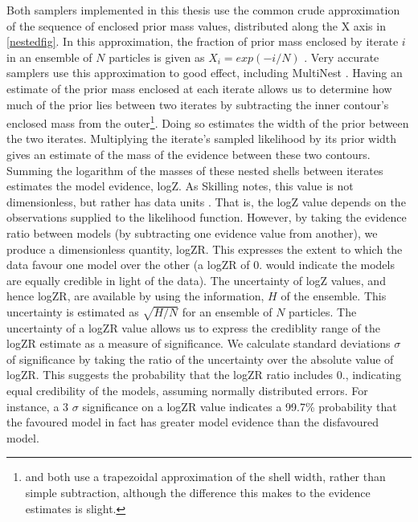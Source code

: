 Both samplers implemented in this thesis use the common crude approximation of the sequence of enclosed prior mass values, distributed along the X axis in \autoref{nestedfig}. In this approximation, the fraction of prior mass enclosed by iterate $i$ in an ensemble of $N$ particles is given as $X_{i}=exp(-i/N)$ \cite{Skilling2006}. Very accurate samplers use this approximation to good effect, including MultiNest \cite{Feroz2009}. Having an estimate of the prior mass enclosed at each iterate allows us to determine how much of the prior lies between two iterates by subtracting the inner contour's enclosed mass from the outer\footnote{ and  both use a trapezoidal approximation of the shell width, rather than simple subtraction, although the difference this makes to the evidence estimates is slight.}. Doing so estimates the width of the prior between the two iterates. Multiplying the iterate's sampled likelihood by its prior width gives an estimate of the mass of the evidence between these two contours. Summing the logarithm of the masses of these nested shells between iterates estimates the model evidence, logZ. As Skilling notes, this value is not dimensionless, but rather has data units \cite{Skilling2012}. That is, the logZ value depends on the observations supplied to the likelihood function. However, by taking the evidence ratio between models (by subtracting one evidence value from another), we produce a dimensionless quantity, logZR. This expresses the extent to which the data favour one model over the other (a logZR of 0. would indicate the models are equally credible in light of the data). The uncertainty of logZ values, and hence logZR, are available by using the information, $H$ of the ensemble. This uncertainty is estimated as $\sqrt{H/N}$ for an ensemble of $N$ particles. The uncertainty of a logZR value allows us to express the crediblity range of the logZR estimate as a measure of significance. We calculate standard deviations $\sigma$ of significance by taking the ratio of the uncertainty over the absolute value of logZR. This suggests the probability that the logZR ratio includes 0., indicating equal credibility of the models, assuming normally distributed errors. For instance, a 3 $\sigma$ significance on a logZR value indicates a 99.7\% probability that the favoured model in fact has greater model evidence than the disfavoured model.

